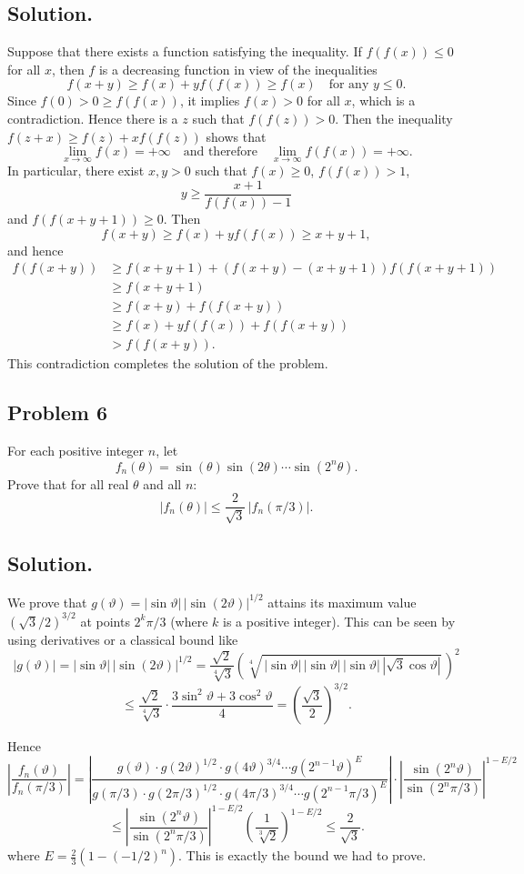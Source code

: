 \documentclass{article}
\begin{document}
\subsection*{Solution.} Suppose that there exists a function satisfying the inequality. If $f(f(x)) \leq 0$ for all $x$, then $f$ is a decreasing function in view of the inequalities
\[
f(x+y) \geq f(x) + y f(f(x)) \geq f(x) \quad \text{for any } y \leq 0.
\]
Since $f(0) > 0 \geq f(f(x))$, it implies $f(x) > 0$ for all $x$, which is a contradiction. Hence there is a $z$ such that $f(f(z)) > 0$. Then the inequality $f(z+x) \geq f(z) + x f(f(z))$ shows that
\[
\lim_{x \to \infty} f(x) = +\infty \quad \text{and therefore} \quad \lim_{x \to \infty} f(f(x)) = +\infty.
\]
In particular, there exist $x,y>0$ such that $f(x) \geq 0$, $f(f(x)) > 1$,
\[
y \geq \frac{x+1}{f(f(x))-1}
\]
and $f(f(x+y+1)) \geq 0$. Then
\[
f(x+y) \geq f(x) + y f(f(x)) \geq x + y + 1,
\]
and hence
\[
\begin{aligned}
f(f(x+y)) &\geq f(x+y+1) + (f(x+y) - (x+y+1)) f(f(x+y+1)) \\
&\geq f(x+y+1) \\
&\geq f(x+y) + f(f(x+y)) \\
&\geq f(x) + y f(f(x)) + f(f(x+y)) \\
&> f(f(x+y)).
\end{aligned}
\]
This contradiction completes the solution of the problem.

\subsection*{Problem 6}
For each positive integer $n$, let
\[
f_n(\theta) = \sin(\theta) \sin(2\theta) \cdots \sin(2^n \theta).
\]
Prove that for all real $\theta$ and all $n$:
\[
|f_n(\theta)| \leq \frac{2}{\sqrt{3}} \, |f_n(\pi/3)|.
\]

\subsection*{Solution.} We prove that $g(\vartheta) = |\sin \vartheta|\, |\sin(2\vartheta)|^{1/2}$ attains its maximum value $\left(\sqrt{3}/2\right)^{3/2}$ at points $2^k \pi/3$ (where $k$ is a positive integer). This can be seen by using derivatives or a classical bound like
\[
|g(\vartheta)| = |\sin \vartheta|\, |\sin(2\vartheta)|^{1/2} = \frac{\sqrt{2}}{\sqrt[4]{3}} \left(\sqrt[4]{\,|\sin \vartheta|\, |\sin \vartheta|\, |\sin \vartheta|\, |\sqrt{3}\cos \vartheta|}\,\right)^2
\]
\[
\leq \frac{\sqrt{2}}{\sqrt[4]{3}} \cdot \frac{3\sin^2 \vartheta + 3\cos^2 \vartheta}{4} = \left(\frac{\sqrt{3}}{2}\right)^{3/2}.
\]

Hence
\[
\left|\frac{f_n(\vartheta)}{f_n(\pi/3)}\right| = \left|\frac{g(\vartheta) \cdot g(2\vartheta)^{1/2} \cdot g(4\vartheta)^{3/4} \cdots g(2^{n-1}\vartheta)^E}{g(\pi/3)\cdot g(2\pi/3)^{1/2} \cdot g(4\pi/3)^{3/4} \cdots g(2^{n-1}\pi/3)^E}\right| \cdot \left|\frac{\sin(2^n \vartheta)}{\sin(2^n \pi/3)}\right|^{1-E/2}
\]
\[
\leq \left|\frac{\sin(2^n \vartheta)}{\sin(2^n \pi/3)}\right|^{1-E/2} \left(\frac{1}{\sqrt[3]{2}}\right)^{1-E/2} \leq \frac{2}{\sqrt{3}}.
\]
where $E = \frac{2}{3}(1 - (-1/2)^n)$. This is exactly the bound we had to prove.
\end{document}
